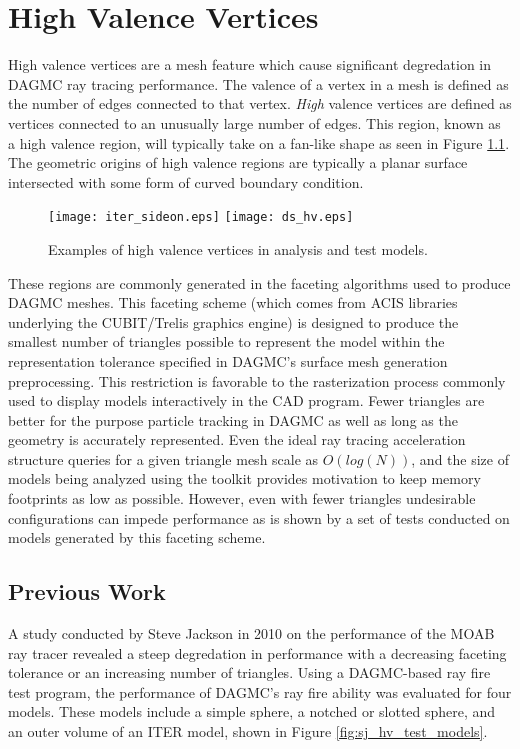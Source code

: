 

\chapter{High Valence Vertices}\label{ch:high_valence}

High valence vertices are a mesh feature which cause significant degredation in
DAGMC ray tracing performance. The valence of a vertex in a mesh is defined as
the number of edges connected to that vertex. \textit{High} valence vertices are
defined as vertices connected to an unusually large number of edges. This
region, known as a high valence region, will typically take on a fan-like shape
as seen in Figure \ref{fig:hv_examples}.  The geometric origins of high valence
regions are typically a planar surface intersected with some form of curved
boundary condition. 

\begin{figure}[H]
  \centering
  \texttt{[image: iter\_sideon.eps]}
  \texttt{[image: ds\_hv.eps]}
  \caption{Examples of high valence vertices in analysis and test models.}
  \label{fig:hv_examples}
\end{figure}

These regions are commonly generated in the faceting algorithms used to produce
DAGMC meshes. This faceting scheme (which comes from ACIS libraries underlying
the CUBIT/Trelis graphics engine) is designed to produce the smallest number of
triangles possible to represent the model within the representation tolerance
specified in DAGMC's surface mesh generation preprocessing. This restriction is
favorable to the rasterization process commonly used to display models
interactively in the CAD program. Fewer triangles are better for the purpose
particle tracking in DAGMC as well as long as the geometry is accurately
represented. Even the ideal ray tracing acceleration structure queries for a
given triangle mesh scale as $O(log(N))$, and the size of models being analyzed
using the toolkit provides motivation to keep memory footprints as low as
possible. However, even with fewer triangles undesirable configurations can
impede performance as is shown by a set of tests conducted on models generated
by this faceting scheme.

\section{Previous Work}

A study conducted by Steve Jackson in 2010 on the performance of the MOAB ray
tracer revealed a steep degredation in performance with a decreasing faceting
tolerance or an increasing number of triangles. Using a DAGMC-based ray fire
test program, the performance of DAGMC's ray fire ability was evaluated for four
models. These models include a simple sphere, a notched or slotted sphere, and
an outer volume of an ITER model, shown in Figure \ref{fig:sj_hv_test_models}.

